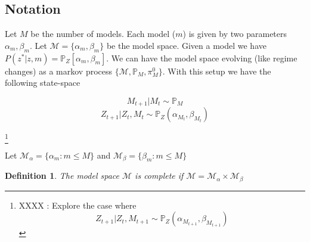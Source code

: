 \documentclass[12pt]{article}
\newtheorem{definition}{Definition}
\begin{document}
\subsection{Notation}
Let $M$ be the number of models. Each model ($m$) is given by two parameters $\alpha_m,\beta_m$. Let $\mathcal{M}=\{\alpha_m,\beta_m\}$ be the model space. Given a model we have $P(z^*|z,m)=\mathbb{P}_{Z}[\alpha_m,\beta_m]$. We can have the model space evolving (like regime changes) as a markov process $\{\mathcal{M},\mathbb{P}_{M},\pi^0_{M}\}$. With this setup we have the following state-space

\[M_{t+1} | M_t \sim \mathbb{P}_{M}\]
\[Z_{t+1}|Z_t,M_t \sim \mathbb{P}_{Z}(\alpha_{M_t},\beta_{M_t})\]



\footnote{XXXX : Explore the case where \[Z_{t+1}|Z_t,M_{t+1} \sim \mathbb{P}_{Z}(\alpha_{M_{t+1}},\beta_{M_{t+1}})\]}


Let $\mathcal{M}_{\alpha} = \{\alpha_m : m\leq M\}$ and  $\mathcal{M}_{\beta} = \{\beta_m : m\leq M\}$

\begin{definition}
The model space $\mathcal{M}$ is complete if $\mathcal{M}=\mathcal{M}_{\alpha} \times \mathcal{M}_{\beta}$
\end{definition}
\end{document}
